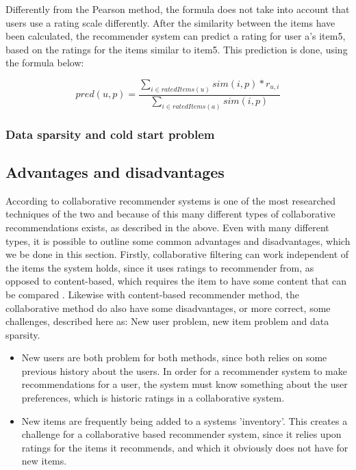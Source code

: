 Differently from the Pearson method, the formula does not take into account that users use a rating scale differently. 
After the similarity between the items have been calculated, the recommender system can predict a rating for user a's item5, based on the ratings for the items similar to item5. This prediction is done, using the formula below:

\[
	pred(u,p) = \frac{\sum_{i\in ratedItems(u)} sim(i,p) * r_{u,i}}{\sum_{i \in ratedItems(a)} sim(i,p)}
\]

\subsubsection{Data sparsity and cold start problem}
\label{subsec:data_sparsity}

\subsection{Advantages and disadvantages}
According to  collaborative recommender systems is one of the most researched techniques of the two and because of this many different types of collaborative recommendations exists, as described in the above. Even with many different types, it is possible to outline some common advantages and disadvantages, which we be done in this section. Firstly, collaborative filtering can work independent of the items the system holds, since it uses ratings to recommender from, as opposed to content-based, which requires the item to have some content that can be compared . 
Likewise with content-based recommender method, the collaborative method do also have some disadvantages, or more correct, some challenges, described here as: New user problem, new item problem and data sparsity. 
\begin{itemize}
	\item New users are both problem for both methods, since both relies on some previous history about the users. In order for a recommender system to make recommendations for a user, the system must know something about the user preferences, which is historic ratings in a collaborative system. 
	\item New items are frequently being added to a systems 'inventory'. This creates a challenge for a collaborative based recommender system, since it relies upon ratings for the items it recommends, and which it obviously does not have for new items.  
\end{itemize}